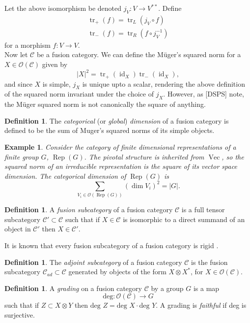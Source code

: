 \documentclass[11pt]{book}
\theoremstyle{Rem}
\newtheorem{Expl}[theorem]{Example}
\theoremstyle{definition}
\newtheorem{Def}[theorem]{Definition}
\numberwithin{equation}{section}
\newcommand\tr{\operatorname{tr}}
\newcommand\inv{^{-1}}
\newcommand\id{\operatorname{id}}
\newcommand\Rep{\operatorname{Rep}}
\newcommand\Vect{\operatorname{Vec}}
\newcommand\C{\mathcal C}
\newcommand\OO{\mathcal O}
\begin{document}
Let the above isomorphism be denoted $j_V:V\rightarrow V^{**}$. Define \begin{align}
	\tr_+(f) = \tr_L(j_V\circ f)\\
	\tr_-(f) = \tr_R(f\circ j_V\inv)
\end{align}
for a morphism $f: V\rightarrow V$.\\
Now let $\C$ be a fusion category. 
We can define the M\"uger's squared norm for a $X\in \OO(\C)$ given by \begin{equation}
	|X|^2 = \tr_+(\id_X)\tr_-(\id_X),
\end{equation}
and since $X$ is simple, $j_X$ is unique upto a scalar, rendering the above definition of the squared norm invariant under the choice of $j_X$. However, as [DSPS] note, the M\"uger squared norm is not canonically the square of anything. \\
\begin{Def}
The \textit{categorical} (or \textit{global}) \textit{dimension} of a fusion category is defined to be the sum of Muger's squared norms of its simple objects.
\end{Def}
\begin{Expl}\rm
Consider the category of finite dimensional representations of a finite group $G$, $\Rep(G)$.  The pivotal structure is inherited from $\Vect$, so the squared norm of an irreducible representation is the square of its vector space dimension. The categorical dimension of $\Rep(G)$ is \begin{equation}
	\sum_{V_i\in \OO(\Rep(G))} (\dim V_i)^2 = |G|.
\end{equation}
\end{Expl}
\begin{Def}
A \textit{fusion subcategory}  of a fusion category $\C$ is a full tensor subcategory $\C'\subset \C$ such that if $X\in \C$ is isomorphic to a direct summand of an object in $\C'$ then $X\in \C'$.
\end{Def}
 It is known that every fusion subcategory of a fusion category is rigid \cite[Corollary F.7]{MR2609644}.
 \begin{Def}
 The \textit{adjoint subcategory} of a fusion category $\C$ is the fusion subcategory $\C_{ad} \subset \C$ generated by objects of the form $X\otimes X^*$, for $X\in \OO(\C)$.
 \end{Def}
\begin{Def}
A \textit{grading} on a fusion category $\C$ by a group $G$ is a map \begin{equation}
	\text{deg}: \OO(\C) \rightarrow G \label{deg}
\end{equation}
such that if $Z\subset X\otimes Y$ then $\text{deg } Z = \text{deg } X\cdot \text{deg } Y$. A grading is \textit{faithful} if deg is surjective. 
\end{Def}
\end{document}

